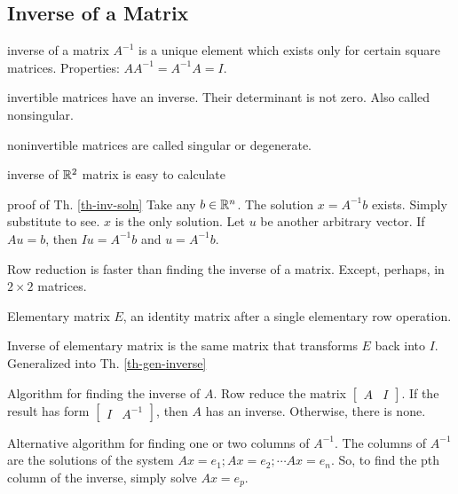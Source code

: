 \begin{card}
    \subsection{Inverse of a Matrix}

    \begin{compactdesc}
    \item[inverse] of a matrix $A^{-1}$ is a unique element which exists only
        for certain square matrices. Properties: $AA^{-1} = A^{-1}A = I$.
    \item[invertible] matrices have an inverse. Their determinant is not zero.
        Also called nonsingular.
    \item[noninvertible] matrices are called singular or degenerate.
    \item[inverse of $\mathbb{R}^2$] matrix is easy to calculate
    \item[proof of Th. \ref{th-inv-soln}]
        Take any $b \in \mathbb{R}^n$. The solution $x = A^{-1}b$ exists. Simply
        substitute to see. $x$ is the only solution. Let $u$ be another
        arbitrary vector. If $Au = b$, then $Iu = A^{-1}b$ and $u = A^{-1}b$.
    \item[Row reduction] is faster than finding the inverse of a matrix.
        Except, perhaps, in $2\times2$ matrices.
    \item[Elementary matrix] $E$, an identity matrix after a single elementary row
        operation.
    \item[Inverse of elementary] matrix is the same matrix that transforms
        $E$ back into $I$. Generalized into Th. \ref{th-gen-inverse}
    \item[Algorithm for] finding the inverse of $A$. Row reduce the matrix
        $\begin{bmatrix}A & I\end{bmatrix}$. If the result has form
        $\begin{bmatrix}I & A^{-1}\end{bmatrix}$, then $A$ has an inverse.
        Otherwise, there is none.
    \item[Alternative algorithm] for finding one or two columns of $A^{-1}$.
        The columns of $A^{-1}$ are the solutions of the system
        $Ax = e_1; Ax = e_2; \cdots Ax = e_n$. So, to find the pth column
        of the inverse, simply solve $Ax = e_p$.
    \end{compactdesc}
\end{card}
